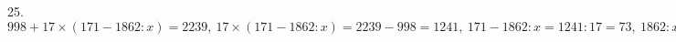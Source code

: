 25. $998+17\times(171-1862:x)=2239,\ 17\times(171-1862:x)=2239-998=1241,\ 171-1862:x=1241:17=73,\ 1862:x=171-73=98,\ x=1862:98=19.$\\
